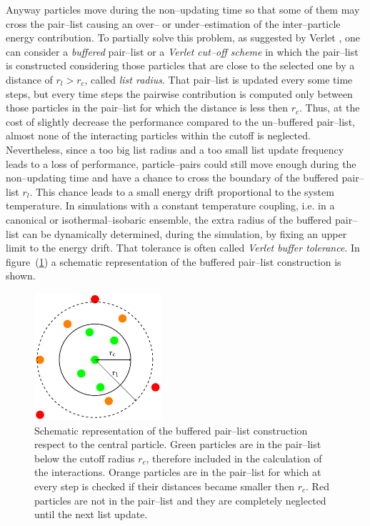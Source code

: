 Anyway particles move during the non--updating time so that some of them may cross the pair--list causing an 
over-- or under--estimation of the inter--particle energy contribution. To partially solve this problem, as 
suggested by Verlet \cite{VerletList}, one can consider a \textit{buffered} pair--list or a \textit{Verlet 
cut--off scheme} in which the pair--list is constructed considering those particles that are close to the 
selected one by a distance of $r_l > r_c$, called \textit{list radius}. That pair--list is updated every some 
time steps, but every time steps the pairwise contribution is computed only between those particles in the 
pair--list for which the distance is less then $r_c$. Thus, at the cost of slightly decrease the performance 
compared to the un--buffered pair--list, almost none of the interacting particles within the cutoff is neglected. 
Nevertheless, since a too big list radius and a too small list update frequency leads to a loss of performance, 
particle--pairs could still move enough during the non--updating time and have a chance to cross the boundary of 
the buffered pair--list $r_l$. This chance leads to a small energy drift proportional to the system temperature. 
In simulations with a constant temperature coupling, i.e. in a canonical or isothermal--isobaric ensemble, the 
extra radius of the buffered pair--list can be dynamically determined, during the simulation, by fixing an upper 
limit to the energy drift. That tolerance is often called \textit{Verlet buffer tolerance}. In 
figure~(\ref{fig:pairlist}) a schematic representation of the buffered pair--list construction is shown.
\begin{figure}
	\includegraphics[width=0.42\textwidth]{./img/pairList/pairList}
	\caption{Schematic representation of the buffered pair--list construction respect to the central particle.
	Green particles are in the pair--list below the cutoff radius $r_c$, therefore included in the calculation of the interactions. Orange particles are in the pair--list for which at every step is checked if their distances became smaller then $r_c$. Red particles are not in the pair--list and they are completely neglected until the next list update.}
	\label{fig:pairlist}
\end{figure}

